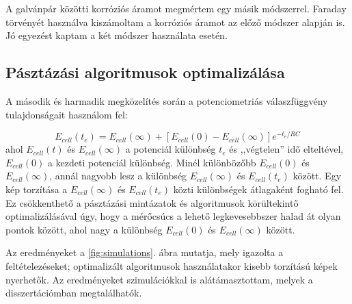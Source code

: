 A galvánpár közötti korróziós áramot megmértem egy másik módszerrel.
Faraday törvényét használva kiszámoltam a korróziós áramot az előző módszer alapján is.
Jó egyezést kaptam a két módszer használata esetén.

\subsection{Pásztázási algoritmusok optimalizálása}
A második és harmadik megközelítés során a potenciometriás válaszfüggvény tulajdonságait használom fel:

\begin{equation}
\label{eq:rc}
        E_{cell}(t_{e}) = E_{cell}(\infty) + [E_{cell}(0) - E_{cell}(\infty)]e^{-t_{e}/RC}
\end{equation}
ahol $E_{cell}(t)$ és $E_{cell}(\infty)$ a potenciál különbség $t_{e}$ és ,,végtelen'' idő elteltével, $E_{cell}(0)$ a kezdeti potenciál különbség.
Minél különbözőbb $E_{cell}(0)$ és $E_{cell}(\infty)$, annál nagyobb lesz a különbség $E_{cell}(\infty)$ és $E_{cell}(t_{e})$ között.
Egy kép torzítása a $E_{cell}(\infty)$ és $E_{cell}(t_{e})$ közti különbségek átlagaként fogható fel.
Ez csökkenthető a pásztázási mintázatok és algoritmusok körültekintő optimalizálásával úgy, hogy a mérőcsúcs a lehető legkevesebbszer halad át olyan pontok között, ahol nagy a különbség $E_{cell}(0)$ és $E_{cell}(\infty)$ között.

Az eredményeket a \ref{fig:simulations}. ábra mutatja, mely igazolta a feltételezéseket; optimalizált algoritmusok használatakor kisebb torzítású képek nyerhetők.
Az eredményeket szimulációkkal is alátámasztottam, melyek a disszertációmban megtalálhatók.

